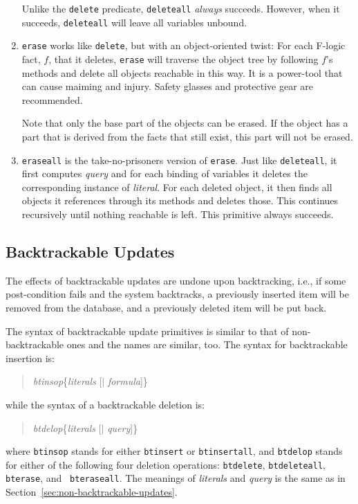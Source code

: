 \documentclass[11pt]{article}
\newcommand{\fl}{\mbox{F-logic}\xspace}
\begin{document}
\begin{enumerate}
  Unlike the {\tt delete} predicate, {\tt deleteall} \emph{always}
  succeeds. However, when it succeeds, {\tt deleteall} will leave
  all variables unbound.
  
\item {\tt erase} works like {\tt delete}, but with an object-oriented
  twist: For each \fl fact, $f$, that it deletes, {\tt erase} will
  traverse the object tree by following $f$'s methods and delete all
  objects reachable in this way. It is a power-tool that can cause
  maiming and injury. Safety glasses and protective gear are
  recommended.
  
  Note that only the base part of the objects can be erased. If the
  object has a part that is derived from the facts that still exist, this
  part will not be erased.
  
\item {\tt eraseall} is the take-no-prisoners version of {\tt erase}.
  Just like {\tt deleteall}, it first computes \emph{query} and for each
  binding of variables it deletes the corresponding instance of
  \emph{literal}. For each deleted object, it then finds all objects it
  references through its methods and deletes those. This continues
  recursively until nothing reachable is left.  This primitive always
  succeeds.
\end{enumerate}


\subsection{Backtrackable Updates}


%
The effects of backtrackable updates are undone upon backtracking, i.e., if
some post-condition fails and the system backtracks, a previously inserted
item will be removed from the database, and a previously deleted item will be
put back.

%
The syntax of backtrackable update primitives is similar to that of
non-backtrackable ones and the names are similar, too.  The syntax for
backtrackable insertion is:
\begin{quote}
\emph{btinsop}\{\emph{literals} [$\mid$ \emph{formula}]\}
\end{quote}
while the syntax of a backtrackable deletion is:
\begin{quote}
\emph{btdelop}\{\emph{literals} [$\mid$ \emph{query}]\}
\end{quote}
where {\tt btinsop} stands for either {\tt btinsert} or {\tt btinsertall},
and {\tt btdelop} stands for either of the following four deletion
operations: {\tt btdelete}, {\tt btdeleteall}, {\tt bterase}, and {\tt
  bteraseall}. The meanings of {\it literals} and {\it query} is
the same as in Section~\ref{sec:non-backtrackable-updates}.
\end{document}
